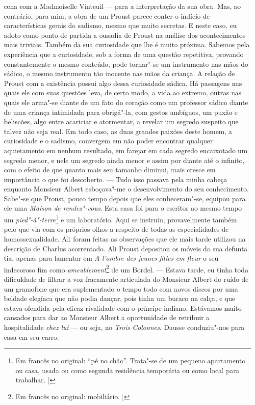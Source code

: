 cena com a Madmoiselle Vinteuil --- para a interpretação da sua obra.
Mas, ao contrário, para mim, a obra de um Proust parece conter o indício
de características gerais do sadismo, mesmo que muito secretas. E neste
caso, eu adoto como ponto de partida a ousadia de Proust na análise dos
acontecimentos mais triviais. Também da sua curiosidade que lhe é muito
próxima. Sabemos pela experiência que a curiosidade, sob a forma de uma
questão repetitiva, provando constantemente o mesmo conteúdo, pode
tornar"-se um instrumento nas mãos do sádico, o mesmo instrumento tão
inocente nas mãos da criança. A relação de Proust com a existência
possui algo dessa curiosidade sádica. Há passagens nas quais ele com
suas questões leva, de certo modo, a vida ao extremo, outras nas quais
ele arma"-se diante de um fato do coração como um professor sádico diante
de uma criança intimidada para obrigá"-la, com gestos ambíguos, um puxão
e beliscões, algo entre acariciar e atormentar, a revelar um segredo
suspeito que talvez não seja real. Em todo caso, as duas grandes paixões
deste homem, a curiosidade e o sadismo, convergem em não poder encontrar
qualquer aquietamento em nenhum resultado, em farejar em cada segredo
encaixotado um segredo menor, e nele um segredo ainda menor e assim por
diante até o infinito, com o efeito de que quanto mais seu tamanho
diminui, mais cresce em importância o que foi descoberto. --- Tudo isso
passava pela minha cabeça enquanto Monsieur Albert esboçava"-me o
desenvolvimento do seu conhecimento. Sabe"-se que Proust, pouco tempo
depois que eles conheceram"-se, equipou para ele uma \emph{Maison de
rendez"-vous}. Esta casa foi para o escritor ao mesmo tempo um
\emph{pied"-à"-terre}\footnote{Em francês no original: ``pé no chão''. Trata"-se de um pequeno apartamento ou casa, usada ou como segunda residência temporária ou como local para trabalhar. {[}\versal{N. T.}{]}} e um laboratório. Aqui se instruiu,
provavelmente também pelo que via com os próprios olhos a respeito de
todas as especialidades de homossexualidade. Ali foram feitas as
observações que ele mais tarde utilizou na descrição de Charlus
acorrentado. Ali Proust depositou os móveis da sua defunta tia, apenas
para lamentar em \emph{A l'ombre des jeunes filles em fleur} o seu
indecoroso fim como \emph{ameublement}\footnote{Em francês no original: mobiliário. {[}\versal{N. T.}{]}} de um Bordel. --- Estava tarde, eu
tinha toda dificuldade de filtrar a voz fracamente articulada do
Monsieur Albert do ruído de um gramofone que era suplementado o tempo
todo com novos discos por uma beldade elegíaca que não podia dançar, pois
tinha um buraco na calça, e que estava ofendida pela eficaz rivalidade
com o príncipe indiano. Estávamos muito cansados para dar ao Monsieur
Albert a oportunidade de retribuir a hospitalidade \emph{chez lui} --- ou
seja, no \emph{Trois Colonnes}. Dausse conduziu"-nos para casa em seu carro.

